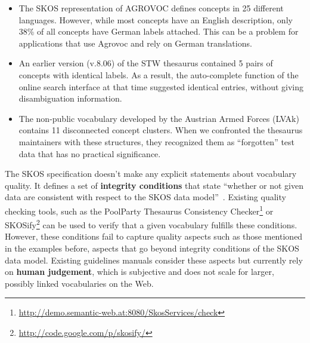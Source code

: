 \begin{itemize}

	\item The SKOS representation of AGROVOC defines concepts in 25 different languages. However, while most concepts have an English description, only 38\% of all concepts have German labels attached. This can be a problem for applications that use Agrovoc and rely on German translations.

	\item An earlier version (v.8.06) of the STW thesaurus contained 5 pairs of concepts with identical labels. As a result, the auto-complete function of the online search interface at that time suggested identical entries, without giving disambiguation information.


	\item The non-public vocabulary developed by the Austrian Armed Forces (LVAk) contains 11 disconnected concept clusters. When we confronted the thesaurus maintainers with these structures, they recognized them as ``forgotten'' test data that has no practical significance.
	

\end{itemize}


The SKOS specification doesn't make any explicit statements about vocabulary quality. It defines a set of \textbf{integrity conditions} that state ``whether or not given data are consistent with respect to the SKOS data model''~\cite{Miles2005}. Existing quality checking tools, such as the PoolParty Thesaurus Consistency Checker\footnote{\url{http://demo.semantic-web.at:8080/SkosServices/check}} or SKOSify\footnote{\url{http://code.google.com/p/skosify/}} can be used to verify that a given vocabulary fulfills these conditions. However, these conditions fail to capture quality aspects such as those mentioned in the examples before, aspects that go beyond integrity conditions of the SKOS data model. Existing guidelines manuals consider these aspects but currently rely on \textbf{human judgement}, which is subjective and does not scale for larger, possibly linked vocabularies on the Web.

